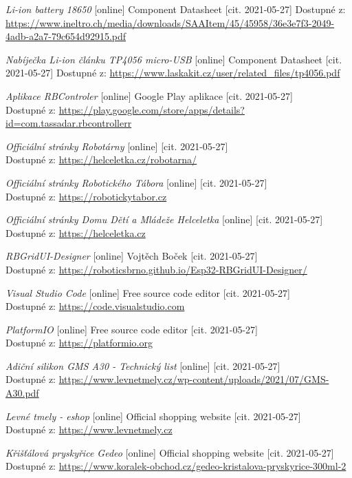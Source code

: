 \begin{thebibliography}{99}
\textit{Li-ion battery 18650} [online] Component Datasheet [cit. 2021-05-27] Dostupné z: \url{https://www.ineltro.ch/media/downloads/SAAItem/45/45958/36e3e7f3-2049-4adb-a2a7-79c654d92915.pdf}

\textit{Nabíječka Li-ion článku TP4056 micro-USB} [online] Component Datasheet [cit. 2021-05-27] Dostupné z: \url{https://www.laskakit.cz/user/related_files/tp4056.pdf}

\textit{Aplikace RBControler} [online] Google Play aplikace [cit. 2021-05-27] \\
Dostupné z: \url{https://play.google.com/store/apps/details?id=com.tassadar.rbcontrollerr}

\textit {Officiální stránky Robotárny} [online] [cit. 2021-05-27] \\
Dostupné z: \url{https://helceletka.cz/robotarna/}

\textit {Officiální stránky Robotického Tábora} [online] [cit. 2021-05-27] \\
Dostupné z: \url{https://robotickytabor.cz}

\textit {Officiální stránky Domu Dětí a Mládeže Helceletka} [online] [cit. 2021-05-27] 
Dostupné z: \url{https://helceletka.cz}

\textit{RBGridUI-Designer} [online] Vojtěch Boček [cit. 2021-05-27] \\
Dostupné z: \url{https://roboticsbrno.github.io/Esp32-RBGridUI-Designer/} 

\textit{Visual Studio Code} [online] Free source code editor [cit. 2021-05-27] \\
Dostupné z: \url{https://code.visualstudio.com} 

\textit{PlatformIO} [online] Free source code editor [cit. 2021-05-27] \\
Dostupné z: \url{https://platformio.org} 

\textit{Adiční silikon GMS A30 - Technický list} [online] [cit. 2021-05-27] \\
Dostupné z: \url{https://www.levnetmely.cz/wp-content/uploads/2021/07/GMS-A30.pdf} 

\textit{Levné tmely - eshop} [online] Official shopping website [cit. 2021-05-27] \\
Dostupné z: \url{https://www.levnetmely.cz} 

\textit{Křišťálová pryskyřice Gedeo} [online] Official shopping website [cit. 2021-05-27] \\
Dostupné z: \url{https://www.koralek-obchod.cz/gedeo-kristalova-pryskyrice-300ml-2} 


\end{thebibliography}
